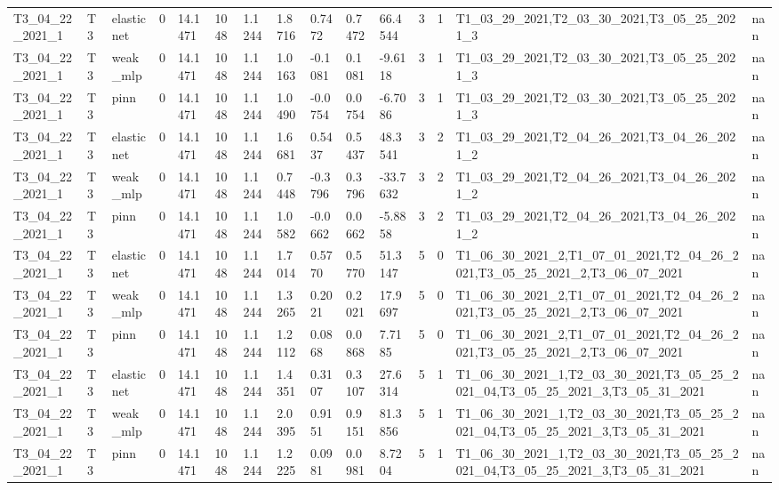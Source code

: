 \begin{table}[t]
\begin{tabular}{lllllllllllllll}
T3\_04\_22\_2021\_1 & T3 & elasticnet & 0 & 14.1471 & 1048 & 1.1244 & 1.8716 & 0.7472 & 0.7472 & 66.4544 & 3 & 1 & T1\_03\_29\_2021,T2\_03\_30\_2021,T3\_05\_25\_2021\_3 & nan \\
T3\_04\_22\_2021\_1 & T3 & weak\_mlp & 0 & 14.1471 & 1048 & 1.1244 & 1.0163 & -0.1081 & 0.1081 & -9.6118 & 3 & 1 & T1\_03\_29\_2021,T2\_03\_30\_2021,T3\_05\_25\_2021\_3 & nan \\
T3\_04\_22\_2021\_1 & T3 & pinn & 0 & 14.1471 & 1048 & 1.1244 & 1.0490 & -0.0754 & 0.0754 & -6.7086 & 3 & 1 & T1\_03\_29\_2021,T2\_03\_30\_2021,T3\_05\_25\_2021\_3 & nan \\
T3\_04\_22\_2021\_1 & T3 & elasticnet & 0 & 14.1471 & 1048 & 1.1244 & 1.6681 & 0.5437 & 0.5437 & 48.3541 & 3 & 2 & T1\_03\_29\_2021,T2\_04\_26\_2021,T3\_04\_26\_2021\_2 & nan \\
T3\_04\_22\_2021\_1 & T3 & weak\_mlp & 0 & 14.1471 & 1048 & 1.1244 & 0.7448 & -0.3796 & 0.3796 & -33.7632 & 3 & 2 & T1\_03\_29\_2021,T2\_04\_26\_2021,T3\_04\_26\_2021\_2 & nan \\
T3\_04\_22\_2021\_1 & T3 & pinn & 0 & 14.1471 & 1048 & 1.1244 & 1.0582 & -0.0662 & 0.0662 & -5.8858 & 3 & 2 & T1\_03\_29\_2021,T2\_04\_26\_2021,T3\_04\_26\_2021\_2 & nan \\
T3\_04\_22\_2021\_1 & T3 & elasticnet & 0 & 14.1471 & 1048 & 1.1244 & 1.7014 & 0.5770 & 0.5770 & 51.3147 & 5 & 0 & T1\_06\_30\_2021\_2,T1\_07\_01\_2021,T2\_04\_26\_2021,T3\_05\_25\_2021\_2,T3\_06\_07\_2021 & nan \\
T3\_04\_22\_2021\_1 & T3 & weak\_mlp & 0 & 14.1471 & 1048 & 1.1244 & 1.3265 & 0.2021 & 0.2021 & 17.9697 & 5 & 0 & T1\_06\_30\_2021\_2,T1\_07\_01\_2021,T2\_04\_26\_2021,T3\_05\_25\_2021\_2,T3\_06\_07\_2021 & nan \\
T3\_04\_22\_2021\_1 & T3 & pinn & 0 & 14.1471 & 1048 & 1.1244 & 1.2112 & 0.0868 & 0.0868 & 7.7185 & 5 & 0 & T1\_06\_30\_2021\_2,T1\_07\_01\_2021,T2\_04\_26\_2021,T3\_05\_25\_2021\_2,T3\_06\_07\_2021 & nan \\
T3\_04\_22\_2021\_1 & T3 & elasticnet & 0 & 14.1471 & 1048 & 1.1244 & 1.4351 & 0.3107 & 0.3107 & 27.6314 & 5 & 1 & T1\_06\_30\_2021\_1,T2\_03\_30\_2021,T3\_05\_25\_2021\_04,T3\_05\_25\_2021\_3,T3\_05\_31\_2021 & nan \\
T3\_04\_22\_2021\_1 & T3 & weak\_mlp & 0 & 14.1471 & 1048 & 1.1244 & 2.0395 & 0.9151 & 0.9151 & 81.3856 & 5 & 1 & T1\_06\_30\_2021\_1,T2\_03\_30\_2021,T3\_05\_25\_2021\_04,T3\_05\_25\_2021\_3,T3\_05\_31\_2021 & nan \\
T3\_04\_22\_2021\_1 & T3 & pinn & 0 & 14.1471 & 1048 & 1.1244 & 1.2225 & 0.0981 & 0.0981 & 8.7204 & 5 & 1 & T1\_06\_30\_2021\_1,T2\_03\_30\_2021,T3\_05\_25\_2021\_04,T3\_05\_25\_2021\_3,T3\_05\_31\_2021 & nan \\

\end{tabular}
\end{table}
